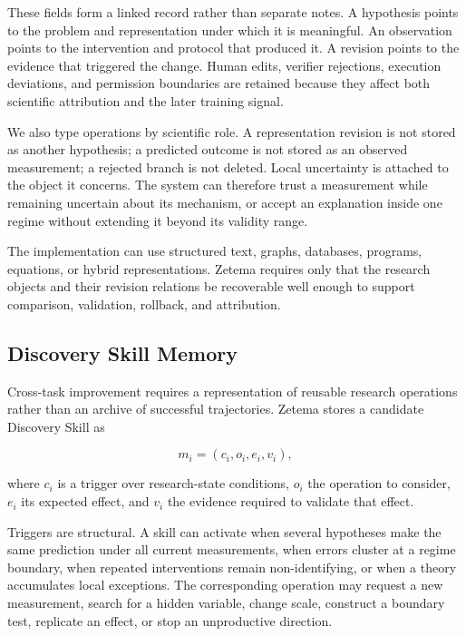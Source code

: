 \documentclass[11pt, a4paper, copyright]{google}
\begin{document}
These fields form a linked record rather than separate notes. A hypothesis points to the problem and representation under which it is meaningful. An observation points to the intervention and protocol that produced it. A revision points to the evidence that triggered the change. Human edits, verifier rejections, execution deviations, and permission boundaries are retained because they affect both scientific attribution and the later training signal.

We also type operations by scientific role. A representation revision is not stored as another hypothesis; a predicted outcome is not stored as an observed measurement; a rejected branch is not deleted. Local uncertainty is attached to the object it concerns. The system can therefore trust a measurement while remaining uncertain about its mechanism, or accept an explanation inside one regime without extending it beyond its validity range.

The implementation can use structured text, graphs, databases, programs, equations, or hybrid representations. Zetema requires only that the research objects and their revision relations be recoverable well enough to support comparison, validation, rollback, and attribution.

\subsection{Discovery Skill Memory}
\label{subsec:discovery-skills}

Cross-task improvement requires a representation of reusable research operations rather than an archive of successful trajectories. Zetema stores a candidate Discovery Skill as

\begin{equation}
m_i=(c_i,o_i,e_i,v_i),
\label{eq:discovery-skill}
\end{equation}

where $c_i$ is a trigger over research-state conditions, $o_i$ the operation to consider, $e_i$ its expected effect, and $v_i$ the evidence required to validate that effect.

Triggers are structural. A skill can activate when several hypotheses make the same prediction under all current measurements, when errors cluster at a regime boundary, when repeated interventions remain non-identifying, or when a theory accumulates local exceptions. The corresponding operation may request a new measurement, search for a hidden variable, change scale, construct a boundary test, replicate an effect, or stop an unproductive direction.
\end{document}
